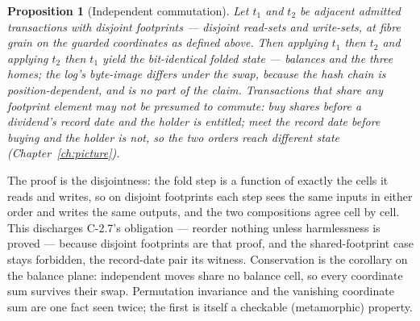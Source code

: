 \documentclass[11pt,a4paper]{article}
\newtheorem{proposition}[definition]{Proposition}
\begin{document}
\begin{proposition}[Independent commutation]\label{prop:independent-commute}
Let $t_1$ and $t_2$ be adjacent admitted transactions with disjoint footprints ---
disjoint read-sets and write-sets, at fibre grain on the guarded coordinates as defined
above. Then applying $t_1$ then $t_2$ and applying $t_2$ then $t_1$ yield the
bit-identical \emph{folded state} --- balances and the three homes; the log's byte-image
differs under the swap, because the hash chain is position-dependent, and is no part of
the claim. Transactions that share any footprint element may not be
presumed to commute: buy shares before a dividend's record date and the holder is
entitled; meet the record date before buying and the holder is not, so the two orders
reach different state (Chapter~\ref{ch:picture}).
\end{proposition}

The proof is the disjointness: the fold step is a function of exactly the cells it reads
and writes, so on disjoint footprints each step sees the same inputs in either order and
writes the same outputs, and the two compositions agree cell by cell. This discharges
C-2.7's obligation --- reorder nothing unless harmlessness is proved --- because disjoint
footprints are that proof, and the shared-footprint case stays forbidden, the record-date
pair its witness. Conservation is the corollary on the balance plane: independent moves
share no balance cell, so every coordinate sum survives their swap. Permutation invariance
and the vanishing coordinate sum are one fact seen twice; the first is itself a checkable
(metamorphic) property.
\end{document}
